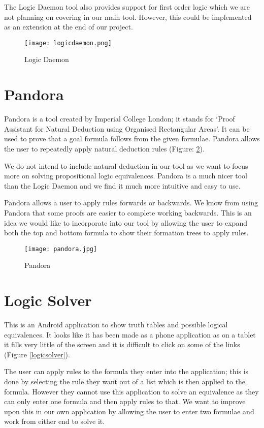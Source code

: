 \documentclass{report}
\begin{document}
The Logic Daemon tool also provides support for first order logic which we are not planning on covering in our main tool. However, this could be implemented as an extension at the end of our project.

\begin{figure}[ht]
    \centering
    \texttt{[image: logicdaemon.png]}
    \caption{Logic Daemon}
    \label{logicdaemon}
\end{figure}

\section{Pandora}
\label{sec:pandora}

Pandora\cite{pandora} is a tool created by Imperial College London; it stands for `Proof Assistant for Natural Deduction using Organised Rectangular Areas'. It can be used to prove that a goal formula follows from the given formulae. Pandora allows the user to repeatedly apply natural deduction rules (Figure: \ref{pandora}).

We do not intend to include natural deduction in our tool as we want to focus more on solving propositional logic equivalences. Pandora is a much nicer tool than the Logic Daemon and we find it much more intuitive and easy to use.

Pandora allows a user to apply rules forwards or backwards. We know from using Pandora that some proofs are easier to complete working backwards. This is an idea we would like to incorporate into our tool by allowing the user to expand both the top and bottom formula to show their formation trees to apply rules. 

\begin{figure}[ht!]
    \centering
    \texttt{[image: pandora.jpg]}
    \caption{Pandora}
    \label{pandora}
\end{figure}

\section{Logic Solver}

This is an Android application to show truth tables and possible logical equivalences. It looks like it has been made as a phone application as on a tablet it fills very little of the screen and it is difficult to click on some of the links (Figure \ref{logicsolver}).

The user can apply rules to the formula they enter into the application; this is done by selecting the rule they want out of a list which is then applied to the formula. However they cannot use this application to solve an equivalence as they can only enter one formula and then apply rules to that. We want to improve upon this in our own application by allowing the user to enter two formulae and work from either end to solve it.
\end{document}
